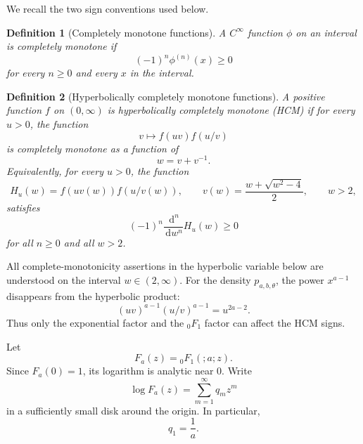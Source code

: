 ﻿\documentclass[preprint,12pt,authoryear]{elsarticle}
\newtheorem{definition}{Definition}
\newcommand{\dd}{\,\mathrm{d}}
\begin{document}
We recall the two sign conventions used below.

\begin{definition}[Completely monotone functions]
A \(C^\infty\) function \(\phi\) on an interval is completely monotone if
\begin{equation}
(-1)^n\phi^{(n)}(x)\ge0
\end{equation}
for every \(n\ge0\) and every \(x\) in the interval.
\end{definition}

\begin{definition}[Hyperbolically completely monotone functions]
A positive function \(f\) on \((0,\infty)\) is hyperbolically completely monotone (HCM) if for every \(u>0\), the function
\begin{equation}
v\mapsto f(uv)f(u/v)
\end{equation}
is completely monotone as a function of
\begin{equation}
w=v+v^{-1}.
\end{equation}
Equivalently, for every \(u>0\), the function
\begin{equation}
H_u(w)=f(uv(w))f(u/v(w)),
\qquad
v(w)=\frac{w+\sqrt{w^2-4}}2,
\qquad w>2,
\end{equation}
satisfies
\begin{equation}
(-1)^n\frac{\dd^n}{\dd w^n}H_u(w)\ge0
\end{equation}
for all \(n\ge0\) and all \(w>2\).
\end{definition}

All complete-monotonicity assertions in the hyperbolic variable below are understood on the interval \(w\in(2,\infty)\).  For the density \(p_{a,b,\theta}\), the power \(x^{a-1}\) disappears from the hyperbolic product:
\begin{equation}
(uv)^{a-1}(u/v)^{a-1}=u^{2a-2}.
\end{equation}
Thus only the exponential factor and the \({}_0F_1\) factor can affect the HCM signs.

Let
\begin{equation}
F_a(z)={}_0F_1(;a;z).
\end{equation}
Since \(F_a(0)=1\), its logarithm is analytic near \(0\).  Write
\begin{equation}
\label{eq:log-Fa}
\log F_a(z)=\sum_{m=1}^{\infty}q_m z^m
\end{equation}
in a sufficiently small disk around the origin.  In particular,
\begin{equation}
q_1=\frac1a.
\end{equation}
\end{document}
